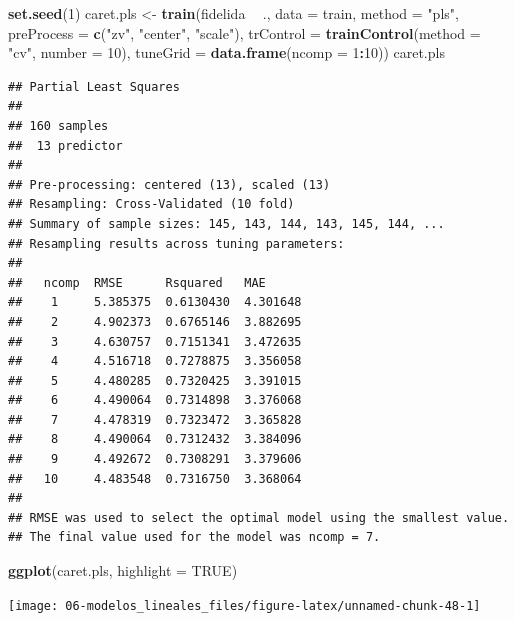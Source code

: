 \documentclass[
]{book}
\newenvironment{Shaded}{\begin{snugshade}}{\end{snugshade}}
\newcommand{\DataTypeTok}[1]{\textcolor[rgb]{0.13,0.29,0.53}{#1}}
\newcommand{\DecValTok}[1]{\textcolor[rgb]{0.00,0.00,0.81}{#1}}
\newcommand{\KeywordTok}[1]{\textcolor[rgb]{0.13,0.29,0.53}{\textbf{#1}}}
\newcommand{\NormalTok}[1]{#1}
\newcommand{\OperatorTok}[1]{\textcolor[rgb]{0.81,0.36,0.00}{\textbf{#1}}}
\newcommand{\OtherTok}[1]{\textcolor[rgb]{0.56,0.35,0.01}{#1}}
\newcommand{\StringTok}[1]{\textcolor[rgb]{0.31,0.60,0.02}{#1}}
\theoremstyle{break}
\theoremstyle{definition}
\theoremstyle{definition}
\theoremstyle{definition}
\theoremstyle{remark}
\begin{document}
\begin{Shaded}
\begin{Highlighting}[]
\KeywordTok{set.seed}\NormalTok{(}\DecValTok{1}\NormalTok{)}
\NormalTok{caret.pls <-}\StringTok{ }\KeywordTok{train}\NormalTok{(fidelida }\OperatorTok{~}\StringTok{ }\NormalTok{., }\DataTypeTok{data =}\NormalTok{ train, }\DataTypeTok{method =} \StringTok{"pls"}\NormalTok{,}
                   \DataTypeTok{preProcess =} \KeywordTok{c}\NormalTok{(}\StringTok{"zv"}\NormalTok{, }\StringTok{"center"}\NormalTok{, }\StringTok{"scale"}\NormalTok{),}
                   \DataTypeTok{trControl =} \KeywordTok{trainControl}\NormalTok{(}\DataTypeTok{method =} \StringTok{"cv"}\NormalTok{, }\DataTypeTok{number =} \DecValTok{10}\NormalTok{),}
                   \DataTypeTok{tuneGrid =} \KeywordTok{data.frame}\NormalTok{(}\DataTypeTok{ncomp =} \DecValTok{1}\OperatorTok{:}\DecValTok{10}\NormalTok{))}
\NormalTok{caret.pls}
\end{Highlighting}
\end{Shaded}

\begin{verbatim}
## Partial Least Squares 
## 
## 160 samples
##  13 predictor
## 
## Pre-processing: centered (13), scaled (13) 
## Resampling: Cross-Validated (10 fold) 
## Summary of sample sizes: 145, 143, 144, 143, 145, 144, ... 
## Resampling results across tuning parameters:
## 
##   ncomp  RMSE      Rsquared   MAE     
##    1     5.385375  0.6130430  4.301648
##    2     4.902373  0.6765146  3.882695
##    3     4.630757  0.7151341  3.472635
##    4     4.516718  0.7278875  3.356058
##    5     4.480285  0.7320425  3.391015
##    6     4.490064  0.7314898  3.376068
##    7     4.478319  0.7323472  3.365828
##    8     4.490064  0.7312432  3.384096
##    9     4.492672  0.7308291  3.379606
##   10     4.483548  0.7316750  3.368064
## 
## RMSE was used to select the optimal model using the smallest value.
## The final value used for the model was ncomp = 7.
\end{verbatim}

\begin{Shaded}
\begin{Highlighting}[]
\KeywordTok{ggplot}\NormalTok{(caret.pls, }\DataTypeTok{highlight =} \OtherTok{TRUE}\NormalTok{)}
\end{Highlighting}
\end{Shaded}

\begin{center}\texttt{[image: 06-modelos\_lineales\_files/figure-latex/unnamed-chunk-48-1]} \end{center}
\end{document}
